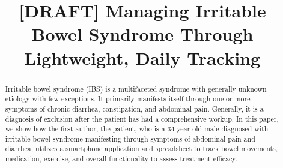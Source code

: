 \documentclass[conference]{IEEEtran}
\begin{document}
%
\title{[DRAFT] Managing Irritable Bowel Syndrome Through Lightweight, Daily Tracking}


\author{

\and

}


\maketitle

\begin{abstract}
Irritable bowel syndrome (IBS) is a multifaceted syndrome with generally unknown etiology with few exceptions.  It primarily manifests itself through one or more symptoms of chronic diarrhea, constipation, and abdominal pain.  Generally, it is a diagnosis of exclusion after the patient has had a comprehensive workup. In this paper, we show how the first author, the patient, who is a 34 year old male diagnosed with irritable bowel syndrome  manifesting through symptoms of abdominal pain and diarrhea, utilizes a smartphone application and spreadsheet to track bowel movements, medication, exercise, and overall functionality to assess treatment efficacy.
\end{abstract}
\end{document}
